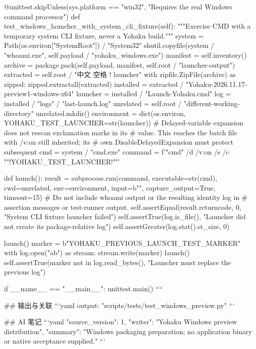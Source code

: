     @unittest.skipUnless(sys.platform == "win32", "Requires the real Windows command processor")
    def test_windows_launcher_with_system_cli_fixture(self):
        """Exercise CMD with a temporary system CLI fixture, never a Yohaku build."""
        system = Path(os.environ["SystemRoot"]) / "System32"
        shutil.copyfile(system / "whoami.exe", self.payload / "yohaku_windows.exe")
        manifest = self.inventory()
        archive = package.pack(self.payload, manifest, self.root / "launcher-output")
        extracted = self.root / "中文 空格 ! launcher"
        with zipfile.ZipFile(archive) as zipped:
            zipped.extractall(extracted)
        installed = extracted / "Yohaku-2026.11.17-preview1-windows-x64"
        launcher = installed / "Launch-Yohaku.cmd"
        log = installed / "logs" / "last-launch.log"
        unrelated = self.root / "different-working-directory"
        unrelated.mkdir()
        environment = dict(os.environ, YOHAKU_TEST_LAUNCHER=str(launcher))
        # Delayed-variable expansion does not rescan exclamation marks in its
        # value. This reaches the batch file with /v:on still inherited; its
        # own DisableDelayedExpansion must protect subsequent %
        cmd = system / "cmd.exe"
        command = f'"{cmd}" /d /v:on /s /c ""!YOHAKU_TEST_LAUNCHER!""'

        def launch():
            result = subprocess.run(command, executable=str(cmd), cwd=unrelated,
                                    env=environment, input=b"", capture_output=True,
                                    timeout=15)
            # Do not include whoami output or the resulting identity log in
            # assertion messages or test-runner output.
            self.assertEqual(result.returncode, 0, "System CLI fixture launcher failed")
            self.assertTrue(log.is_file(), "Launcher did not create its package-relative log")
            self.assertGreater(log.stat().st_size, 0)

        launch()
        marker = b"YOHAKU_PREVIOUS_LAUNCH_TEST_MARKER\n"
        with log.open("ab") as stream:
            stream.write(marker)
        launch()
        self.assertTrue(marker not in log.read_bytes(), "Launcher must replace the previous log")


if __name__ == "__main__":
    unittest.main()
````

## 输出与关联
```yaml
output: "scripts/tests/test_windows_preview.py"
```

## AI 笔记
```yaml
{"source_version": 1, "writer": "Yohaku Windows preview distribution", "summary": "Windows packaging preparation; no application binary or native acceptance supplied."}
```
